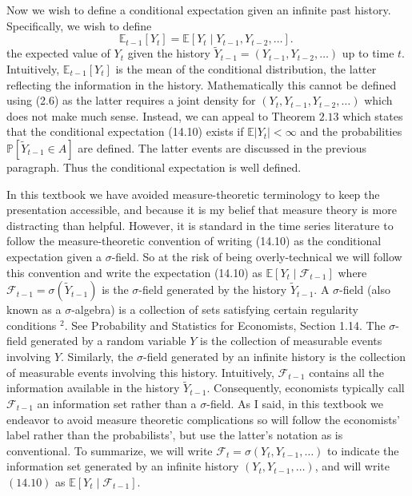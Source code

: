 \documentclass[10pt]{article}
\begin{document}
Now we wish to define a conditional expectation given an infinite past history. Specifically, we wish to define
$$
\mathbb{E}_{t-1}\left[Y_{t}\right]=\mathbb{E}\left[Y_{t} \mid Y_{t-1}, Y_{t-2}, \ldots\right] \text {. }
$$
the expected value of $Y_{t}$ given the history $\widetilde{Y}_{t-1}=\left(Y_{t-1}, Y_{t-2}, \ldots\right)$ up to time $t$. Intuitively, $\mathbb{E}_{t-1}\left[Y_{t}\right]$ is the mean of the conditional distribution, the latter reflecting the information in the history. Mathematically this cannot be defined using (2.6) as the latter requires a joint density for $\left(Y_{t}, Y_{t-1}, Y_{t-2}, \ldots\right)$ which does not make much sense. Instead, we can appeal to Theorem $2.13$ which states that the conditional expectation (14.10) exists if $\mathbb{E}\left|Y_{t}\right|<\infty$ and the probabilities $\mathbb{P}\left[\widetilde{Y}_{t-1} \in A\right]$ are defined. The latter events are discussed in the previous paragraph. Thus the conditional expectation is well defined.

In this textbook we have avoided measure-theoretic terminology to keep the presentation accessible, and because it is my belief that measure theory is more distracting than helpful. However, it is standard in the time series literature to follow the measure-theoretic convention of writing (14.10) as the conditional expectation given a $\sigma$-field. So at the risk of being overly-technical we will follow this convention and write the expectation (14.10) as $\mathbb{E}\left[Y_{t} \mid \mathscr{F}_{t-1}\right]$ where $\mathscr{F}_{t-1}=\sigma\left(\widetilde{Y}_{t-1}\right)$ is the $\sigma$-field generated by the history $\widetilde{Y}_{t-1}$. A $\sigma$-field (also known as a $\sigma$-algebra) is a collection of sets satisfying certain regularity conditions ${ }^{2}$. See Probability and Statistics for Economists, Section 1.14. The $\sigma$-field generated by a random variable $Y$ is the collection of measurable events involving $Y$. Similarly, the $\sigma$-field generated by an infinite history is the collection of measurable events involving this history. Intuitively, $\mathscr{F}_{t-1}$ contains all the information available in the history $\widetilde{Y}_{t-1}$. Consequently, economists typically call $\mathscr{F}_{t-1}$ an information set rather than a $\sigma$-field. As I said, in this textbook we endeavor to avoid measure theoretic complications so will follow the economists' label rather than the probabilists', but use the latter's notation as is conventional. To summarize, we will write $\mathscr{F}_{t}=\sigma\left(Y_{t}, Y_{t-1}, \ldots\right)$ to indicate the information set generated by an infinite history $\left(Y_{t}, Y_{t-1}, \ldots\right)$, and will write $(14.10)$ as $\mathbb{E}\left[Y_{t} \mid \mathscr{F}_{t-1}\right]$.
\end{document}
